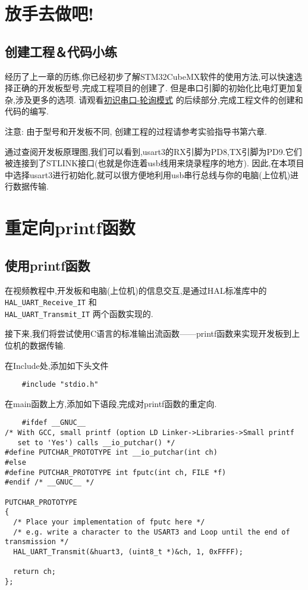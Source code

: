 \section{放手去做吧!}

\subsection{创建工程＆代码小练}
经历了上一章的历练,你已经初步了解STM32CubeMX软件的使用方法,可以快速选择正确的开发板型号,完成工程项目的创建了.
但是串口引脚的初始化比电灯更加复杂,涉及更多的选项.
请观看\href{https://www.bilibili.com/video/BV1Na4y1T7VQ/?spm_id_from=333.788&vd_source=a4cd8065d89f5e61e0854dbe3297fa49}{初识串口-轮询模式}
的后续部分,完成工程文件的创建和代码的编写.

注意: 由于型号和开发板不同, 创建工程的过程请参考实验指导书第六章.

\begin{definition}

	通过查阅开发板原理图,我们可以看到,usart3的RX引脚为PD8,TX引脚为PD9.它们被连接到了STLINK接口(也就是你连着usb线用来烧录程序的地方).
	因此,在本项目中选择usart3进行初始化,就可以很方便地利用usb串行总线与你的电脑(上位机)进行数据传输.

\end{definition}

\section{重定向printf函数}

\subsection{使用printf函数}

在视频教程中,开发板和电脑(上位机)的信息交互,是通过HAL标准库中的 \verb|HAL_UART_Receive_IT| 和\\ \verb|HAL_UART_Transmit_IT| 两个函数实现的.

接下来,我们将尝试使用C语言的标准输出流函数——printf函数来实现开发板到上位机的数据传输.

在Include处,添加如下头文件

\begin{lstlisting}
	#include "stdio.h" 
\end{lstlisting}

在main函数上方,添加如下语段,完成对printf函数的重定向.

\begin{lstlisting}
	#ifdef __GNUC__ 
/* With GCC, small printf (option LD Linker->Libraries->Small printf 
   set to 'Yes') calls __io_putchar() */ 
#define PUTCHAR_PROTOTYPE int __io_putchar(int ch) 
#else 
#define PUTCHAR_PROTOTYPE int fputc(int ch, FILE *f) 
#endif /* __GNUC__ */ 
 
PUTCHAR_PROTOTYPE 
{ 
  /* Place your implementation of fputc here */ 
  /* e.g. write a character to the USART3 and Loop until the end of transmission */ 
  HAL_UART_Transmit(&huart3, (uint8_t *)&ch, 1, 0xFFFF); 
 
  return ch; 
};
\end{lstlisting}

